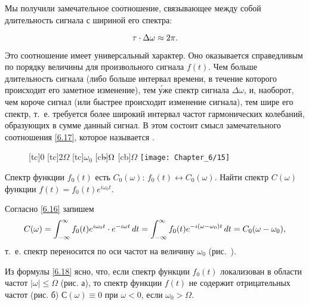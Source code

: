 Мы получили замечательное соотношение, связывающее между собой длительность сигнала с шириной его спектра:

\begin{equation}
	\eqmark{6.17}
	\tau \cdot \Delta\omega \approx 2\pi.
\end{equation}

Это соотношение имеет универсальный характер. Оно оказывается справедливым по порядку величины для произвольного сигнала
$f(t)$. Чем больше длительность сигнала (либо больше интервал времени, в течение которого происходит его заметное
изменение), тем \'уже спектр сигнала $\Delta\omega$, и, наоборот, чем короче сигнал (или быстрее происходит изменение
сигнала), тем шире его спектр, т.~е. требуется более широкий интервал частот гармонических колебаний, образующих в сумме
данный сигнал. В этом состоит смысл замечательного соотношения \eqref{6.17}, которое называется .
\begin{figure}[h!]
	[tc]{0}
	[tc]{$2\Omega$}
	[tc]{$\omega_0$}
	[cb]{$\llap{$-$}\Omega$}
	[cb]{$\Omega$}
	\texttt{[image: Chapter\_6/15]}
	\caption{}
\end{figure}

 Спектр функции $f_0(t)$ есть $C_0(\omega)$: $f_0(t)\leftrightarrow C_0(\omega)$. Найти спектр $C(\omega)$ функции $f(t)=f_0(t)e^{i\omega_0t}$.

Согласно \eqref{6.16} запишем
\begin{equation}
	\eqmark{6.18}
	C(\omega)=\int_{-\infty}^\infty f_0(t)e^{i\omega_0 t}\cdot e^{-i\omega t}\,dt=\int_{-\infty}^\infty
f_0(t)e^{-i(\omega-\omega_0)t}\,dt=C_0(\omega-\omega_0),
\end{equation}
т.~е. спектр переносится по оси частот на величину $\omega_0$ (рис.~).

Из формулы \eqref{6.18} ясно, что, если спектр функции $f_0(t)$ локализован в области частот $|\omega|\le\Omega$ (рис. а),
то спектр функции $f(t)$ не содержит отрицательных частот (рис. б) $С(\omega)\equiv 0$ при $\omega<0$, если
$\omega_0>\Omega$.


